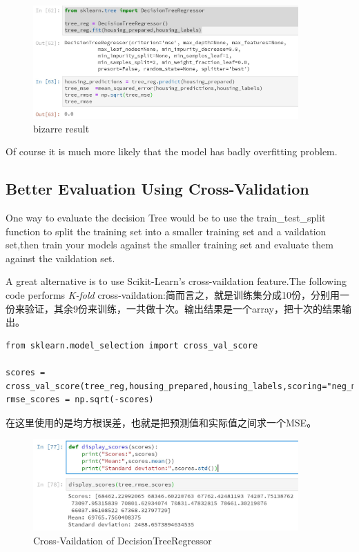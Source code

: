 \documentclass[UTF8]{ctexart}
\begin{document}
\begin{figure}[H]
\centering
\includegraphics[width = 4in]{treeregressorJPG.JPG}
\caption{bizarre result}
\end{figure}


Of course it is much more likely that the model has badly overfitting problem.

\subsection{Better Evaluation Using Cross-Validation}

One way to evaluate the decision Tree would be to use the train\_test\_split function to split the training set into a smaller training set and a vaildation set,then train your models against the smaller training set and evaluate them against the vaildation set.

A great alternative is to use Scikit-Learn's cross-vaildation feature.The following code performs \emph{K-fold} cross-vaildation:简而言之，就是训练集分成10份，分别用一份来验证，其余9份来训练，一共做十次。输出结果是一个array，把十次的结果输出。

\begin{lstlisting}
from sklearn.model_selection import cross_val_score

scores = cross_val_score(tree_reg,housing_prepared,housing_labels,scoring="neg_mean_squared_error",cv=10)
rmse_scores = np.sqrt(-scores)
\end{lstlisting} 

在这里使用的是均方根误差，也就是把预测值和实际值之间求一个MSE。

\begin{figure}[H]
\centering
\includegraphics[width = 4in]{cross_val.JPG}
\caption{Cross-Vaildation of DecisionTreeRegressor}
\end{figure}
\end{document}
